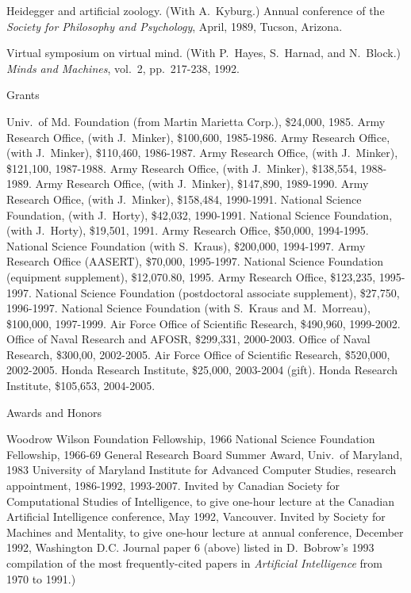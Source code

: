 {\paper
Heidegger and artificial zoology.
(With A.~Kyburg.)
Annual conference of the {\sl Society for Philosophy
and Psychology}, 
April, 1989, Tucson, Arizona.

\paper
Virtual symposium on virtual mind.
(With P.~Hayes, S.~Harnad, and N.~Block.)
{\sl Minds and Machines}, vol.~2, pp.~217-238, 1992.

\eject

\subsec Grants

\expar
Univ.~of Md. Foundation (from Martin Marietta Corp.), \$24,000, 1985.
\expar
Army Research Office, (with J.~Minker), \$100,600, 
1985-1986. %
\expar
Army Research Office, (with J.~Minker), \$110,460, 
1986-1987. %
\expar
Army Research Office, (with J.~Minker), \$121,100,
1987-1988. %
\expar
Army Research Office, (with J.~Minker), \$138,554,
1988-1989. %
\expar
Army Research Office, (with J.~Minker), \$147,890,
1989-1990. %
\expar
Army Research Office, (with J.~Minker), \$158,484,
1990-1991. %
\expar
National Science Foundation, (with J.~Horty), \$42,032,
1990-1991. %
\expar
National Science Foundation, (with J.~Horty), \$19,501,
1991. %
\expar
Army Research Office, \$50,000, 1994-1995. %
\expar
National Science Foundation (with S.~Kraus), \$200,000,
1994-1997. %
\expar
Army Research Office (AASERT), \$70,000,
1995-1997. %
\expar
National Science Foundation (equipment supplement), \$12,070.80, 1995.
\expar
Army Research Office, \$123,235, 1995-1997. %
\expar
National Science Foundation (postdoctoral associate supplement), \$27,750,
 1996-1997.
\expar
National Science Foundation (with S.~Kraus and M.~Morreau), \$100,000,
1997-1999.
\expar
Air Force Office of Scientific Research, \$490,960, 1999-2002.
\expar
Office of Naval Research and AFOSR, \$299,331, 2000-2003.
\expar
Office of Naval Research, \$300,00, 2002-2005.
\expar
Air Force Office of Scientific Research, \$520,000, 2002-2005.
\expar
Honda Research Institute, \$25,000, 2003-2004 (gift).
\expar
Honda Research Institute, \$105,653, 2004-2005.



\eject
\subsec Awards and Honors

\expar
Woodrow Wilson Foundation Fellowship, 1966
\expar
National Science Foundation Fellowship, 1966-69
\expar
General Research Board Summer Award, Univ.~of Maryland, 1983
\expar
University of Maryland Institute for Advanced Computer Studies,
research appointment, 1986-1992, 1993-2007.
\expar
Invited by Canadian Society for Computational Studies of
Intelligence, to give one-hour
lecture at the Canadian Artificial Intelligence conference, 
May 1992, Vancouver.
\expar
Invited by Society for Machines and Mentality, to give one-hour 
lecture at annual conference, December 1992, Washington D.C.
\expar
Journal paper 6 (above) listed in D.~Bobrow's 1993 compilation of the
most frequently-cited papers in {\sl Artificial Intelligence} from
1970 to 1991.)

}
